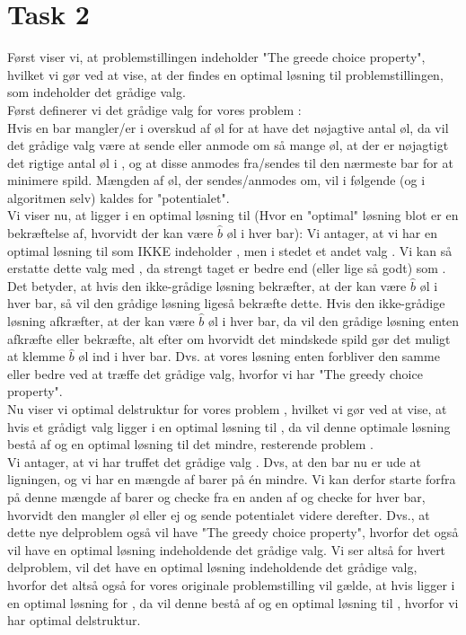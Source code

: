 \section{Task 2}

Først viser vi, at problemstillingen indeholder "The greede choice property", hvilket vi gør ved at vise, at der findes en optimal løsning til problemstillingen, som indeholder det grådige valg.\\
Først definerer vi det grådige valg  for vores problem :\\
Hvis en bar  mangler/er i overskud af  øl for at have det nøjagtive antal øl, da vil det grådige valg være at sende eller anmode om så mange øl, at der er nøjagtigt det rigtige antal øl i , og at disse anmodes fra/sendes til den nærmeste bar for at minimere spild. Mængden af øl, der sendes/anmodes om, vil i følgende (og i algoritmen selv) kaldes for "potentialet".\\
Vi viser nu, at  ligger i en optimal løsning til  (Hvor en "optimal" løsning blot er en bekræftelse af, hvorvidt der kan være $\hat{b}$ øl i hver bar):
Vi antager, at vi har en optimal løsning til  som IKKE indeholder , men i stedet et andet valg . Vi kan så erstatte dette valg  med , da  strengt taget er bedre end (eller lige så godt) som . Det betyder, at hvis den ikke-grådige løsning bekræfter, at der kan være $\hat{b}$ øl i hver bar, så vil den grådige løsning ligeså bekræfte dette. Hvis den ikke-grådige løsning afkræfter, at der kan være $\hat{b}$ øl i hver bar, da vil den grådige løsning enten afkræfte eller bekræfte, alt efter om hvorvidt det mindskede spild gør det muligt at klemme $\hat{b}$ øl ind i hver bar. Dvs. at vores løsning enten forbliver den samme eller bedre ved at træffe det grådige valg, hvorfor vi har "The greedy choice property".\\
Nu viser vi optimal delstruktur for vores problem , hvilket vi gør ved at vise, at hvis et grådigt valg  ligger i en optimal løsning til , da vil denne optimale løsning bestå af  og en optimal løsning til det mindre, resterende problem .\\
Vi antager, at vi har truffet det grådige valg .
Dvs, at den bar nu er ude at ligningen, og vi har en mængde af barer på én mindre. Vi kan derfor starte forfra på denne mængde af barer og checke fra en anden af og checke for hver bar, hvorvidt den mangler øl eller ej og sende potentialet videre derefter. Dvs., at dette nye delproblem  også vil have "The greedy choice property", hvorfor det også vil have en optimal løsning indeholdende det grådige valg. Vi ser altså for hvert delproblem, vil det have en optimal løsning indeholdende det grådige valg, hvorfor det altså også for vores originale problemstilling  vil gælde, at hvis  ligger i en optimal løsning for , da vil denne bestå af  og en optimal løsning til , hvorfor vi har optimal delstruktur.

